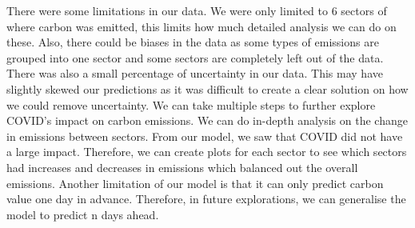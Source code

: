 \documentclass[fontsize=11pt]{article}
\begin{document}
There were some limitations in our data. We were only limited to 6 sectors of where carbon was emitted, this limits how much detailed analysis we can do on these. Also, there could be biases in the data as some types of emissions are grouped into one sector and some sectors are completely left out of the data. There was also a small percentage of uncertainty in our data. This may have slightly skewed our predictions as it was difficult to create a clear solution on how we could remove uncertainty. We can take multiple steps to further explore COVID’s impact on carbon emissions. We can do in-depth analysis on the change in emissions between sectors. From our model, we saw that COVID did not have a large impact. Therefore, we can create plots for each sector to see which sectors had increases and decreases in emissions which balanced out the overall emissions. Another limitation of our model is that it can only predict carbon value one day in advance. Therefore, in future explorations, we can generalise the model to predict n days ahead. 



\nocite{lamb_2019}

\printbibliography

\end{document}
